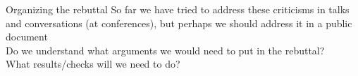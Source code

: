 \documentclass[aspectratio=169,10pt]{beamer}
\begin{document}
\begin{frame}[t]{Organizing the rebuttal}
  So far we have tried to address these criticisms in talks and conversations (at conferences), but perhaps we should address it in a public document\\
  \vspace*{0.5em}
  Do we understand what arguments we would need to put in the rebuttal?\\
  \vspace*{0.5em}
  What results/checks will we need to do?\\
  \vspace*{2em}

\end{frame}



\end{document}
